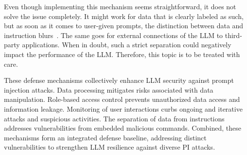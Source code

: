 Even though implementing this mechanism seems straightforward, it does not solve the issue completely. 
It might work for data that is clearly labeled as such, but as soon as it comes to user-given prompts, the distinction between data and instruction blurs~\cite{10.1145/3605764.3623985}. 
The same goes for external connections of the LLM to third-party applications. 
When in doubt, such a strict separation could negatively impact the performance of the LLM.
Therefore, this topic is to be treated with care.

These defense mechanisms collectively enhance LLM security against prompt injection attacks.
Data processing mitigates risks associated with data manipulation.
Role-based access control prevents unauthorized data access and information leakage.
Monitoring of user interactions curbs ongoing and iterative attacks and suspicious activities.
The separation of data from instructions addresses vulnerabilities from embedded malicious commands.
Combined, these mechanisms form an integrated defense baseline, addressing distinct vulnerabilities to strengthen LLM resilience against diverse PI attacks.
